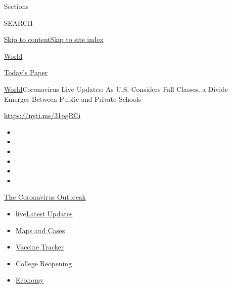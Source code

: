 Sections

SEARCH

\protect\hyperlink{site-content}{Skip to
content}\protect\hyperlink{site-index}{Skip to site index}

\href{https://www.nytimes3xbfgragh.onion/section/world}{World}

\href{https://myaccount.nytimes3xbfgragh.onion/auth/login?response_type=cookie\&client_id=vi}{}

\href{https://www.nytimes3xbfgragh.onion/section/todayspaper}{Today's
Paper}

\href{/section/world}{World}\textbar{}Coronavirus Live Updates: As U.S.
Considers Fall Classes, a Divide Emerges Between Public and Private
Schools

\url{https://nyti.ms/31pgRCi}

\begin{itemize}
\item
\item
\item
\item
\item
\item
\end{itemize}

\href{https://www.nytimes3xbfgragh.onion/news-event/coronavirus?action=click\&pgtype=Article\&state=default\&region=TOP_BANNER\&context=storylines_menu}{The
Coronavirus Outbreak}

\begin{itemize}
\tightlist
\item
  live\href{https://www.nytimes3xbfgragh.onion/2020/08/04/world/coronavirus-cases.html?action=click\&pgtype=Article\&state=default\&region=TOP_BANNER\&context=storylines_menu}{Latest
  Updates}
\item
  \href{https://www.nytimes3xbfgragh.onion/interactive/2020/us/coronavirus-us-cases.html?action=click\&pgtype=Article\&state=default\&region=TOP_BANNER\&context=storylines_menu}{Maps
  and Cases}
\item
  \href{https://www.nytimes3xbfgragh.onion/interactive/2020/science/coronavirus-vaccine-tracker.html?action=click\&pgtype=Article\&state=default\&region=TOP_BANNER\&context=storylines_menu}{Vaccine
  Tracker}
\item
  \href{https://www.nytimes3xbfgragh.onion/2020/08/02/us/covid-college-reopening.html?action=click\&pgtype=Article\&state=default\&region=TOP_BANNER\&context=storylines_menu}{College
  Reopening}
\item
  \href{https://www.nytimes3xbfgragh.onion/live/2020/08/04/business/stock-market-today-coronavirus?action=click\&pgtype=Article\&state=default\&region=TOP_BANNER\&context=storylines_menu}{Economy}
\end{itemize}

